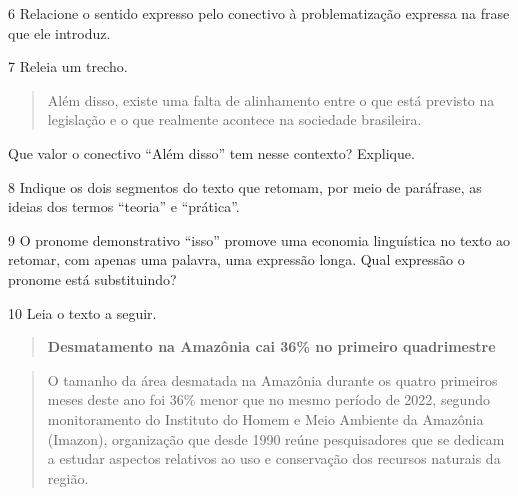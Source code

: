 
\num{6} Relacione o sentido expresso pelo conectivo à problematização
expressa na frase que ele introduz.


\num{7} Releia um trecho.

\begin{quote}
Além disso, existe uma falta de alinhamento entre o que está previsto na
legislação e o que realmente acontece na sociedade brasileira.
\end{quote}

Que valor o conectivo ``Além disso'' tem nesse contexto? Explique.


\num{8} Indique os dois segmentos do texto que retomam, por meio de
paráfrase, as ideias dos termos ``teoria'' e ``prática''.


\num{9} O pronome demonstrativo ``isso'' promove uma economia
linguística no texto ao retomar, com apenas uma palavra, uma expressão
longa. Qual expressão o pronome está substituindo?


\num{10} Leia o texto a seguir.

\begin{quote}
\textbf{Desmatamento na Amazônia cai 36\% no primeiro quadrimestre}
\end{quote}

\begin{quote}
O tamanho da área desmatada na Amazônia durante os quatro primeiros
meses deste ano foi 36\% menor que no mesmo período de 2022, segundo
monitoramento do Instituto do Homem e Meio Ambiente da Amazônia
(Imazon), organização que desde 1990 reúne pesquisadores que se dedicam
a estudar aspectos relativos ao uso e conservação dos recursos naturais
da região.
\end{quote}

